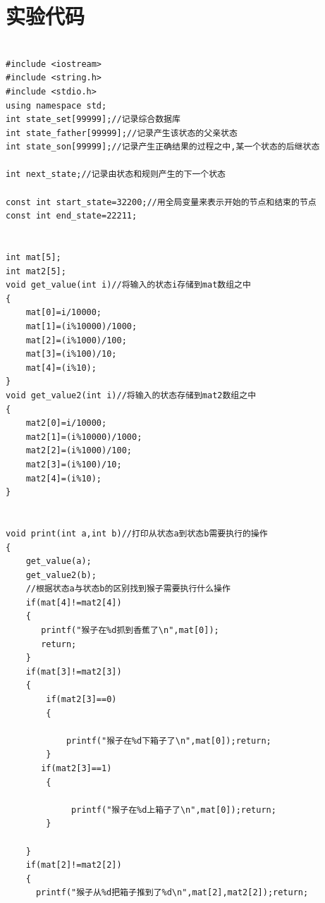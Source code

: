 \documentclass[forprint]{WHUBachelor}
\begin{document}
\chapter{实验代码}
\begin{verbatim}

#include <iostream>
#include <string.h>
#include <stdio.h>
using namespace std;
int state_set[99999];//记录综合数据库
int state_father[99999];//记录产生该状态的父亲状态
int state_son[99999];//记录产生正确结果的过程之中,某一个状态的后继状态

int next_state;//记录由状态和规则产生的下一个状态

const int start_state=32200;//用全局变量来表示开始的节点和结束的节点
const int end_state=22211;


int mat[5];
int mat2[5];
void get_value(int i)//将输入的状态i存储到mat数组之中
{
    mat[0]=i/10000;
    mat[1]=(i%10000)/1000;
    mat[2]=(i%1000)/100;
    mat[3]=(i%100)/10;
    mat[4]=(i%10);
}
void get_value2(int i)//将输入的状态存储到mat2数组之中
{
    mat2[0]=i/10000;
    mat2[1]=(i%10000)/1000;
    mat2[2]=(i%1000)/100;
    mat2[3]=(i%100)/10;
    mat2[4]=(i%10);
}


void print(int a,int b)//打印从状态a到状态b需要执行的操作
{
    get_value(a);
    get_value2(b);
    //根据状态a与状态b的区别找到猴子需要执行什么操作
    if(mat[4]!=mat2[4])
    {
       printf("猴子在%d抓到香蕉了\n",mat[0]);
       return;
    }
    if(mat[3]!=mat2[3])
    {
        if(mat2[3]==0)
        {

            printf("猴子在%d下箱子了\n",mat[0]);return;
        }
       if(mat2[3]==1)
        {

             printf("猴子在%d上箱子了\n",mat[0]);return;
        }

    }
    if(mat[2]!=mat2[2])
    {
      printf("猴子从%d把箱子推到了%d\n",mat[2],mat2[2]);return;


\end{verbatim}
\end{document}
